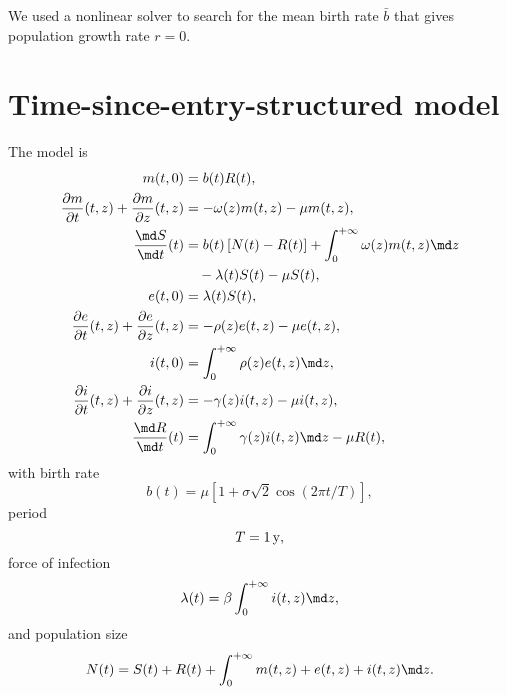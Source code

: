 \documentclass{jpmarticle}
\begin{document}
We used a nonlinear solver to search for the mean birth rate $\bar{b}$
that gives population growth rate $r = 0$.


\section{Time-since-entry-structured model}

The model is
\begin{equation}
  \label{model_time_since_entry_structured}
  \begin{split}
    m(t, 0) &=
    b(t) R(t),
    \\
    \frac{\partial m}{\partial t}(t, z)
    + \frac{\partial m}{\partial z}(t, z) &=
    - \omega(z) m(t, z) - \mu m(t, z),
    \\
    \frac{\md S}{\md t}(t) &=
    b(t) \left[N(t) - R(t)\right]
    + \int_0^{+\infty} \omega(z) m(t, z) \md z
    \\ & \quad {}
    - \lambda(t) S(t) - \mu S(t),
    \\
    e(t, 0) &=
    \lambda(t) S(t),
    \\
    \frac{\partial e}{\partial t}(t, z)
    + \frac{\partial e}{\partial z}(t, z) &=
    - \rho(z) e(t, z) - \mu e(t, z),
    \\
    i(t, 0) &=
    \int_0^{+\infty} \rho(z) e(t, z) \md z,
    \\
    \frac{\partial i}{\partial t}(t, z)
    + \frac{\partial i}{\partial z}(t, z) &=
    - \gamma(z) i(t, z) - \mu i(t, z),
    \\
    \frac{\md R}{\md t}(t) &=
    \int_0^{+\infty} \gamma(z) i(t, z) \md z
    - \mu R(t),
  \end{split}
\end{equation}
with birth rate
\begin{equation}
  b(t) = \mu \left[
    1 + \sigma \sqrt{2} \cos\left(2 \pi t / T\right)
  \right],
\end{equation}
period
\begin{equation}
  T = \unit[1]y,
\end{equation}
force of infection
\begin{equation}
  \lambda(t) = \beta \int_0^{+\infty} i(t, z) \md z,
\end{equation}
and population size
\begin{equation}
  N(t) =
  S(t) + R(t)
  + \int_0^{+\infty} m(t, z) + e(t, z) + i(t, z) \md z.
\end{equation}
\end{document}
